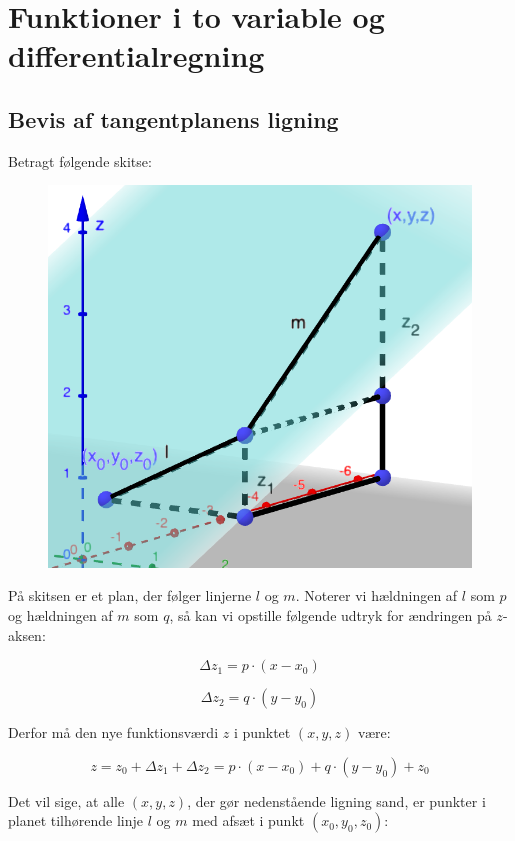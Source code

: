 \documentclass{article}
\makeatletter
\newenvironment{proofw}{\par
  \pushQED{\qed}%
  \normalfont \topsep6\p@\@plus6\p@\relax
  \trivlist
  \item[]\ignorespaces
}{%
  \popQED\endtrivlist\@endpefalse
}
\makeatother
\begin{document}
\section{Funktioner i to variable og differentialregning}

\subsection{Bevis af tangentplanens ligning}

\begin{proofw}

Betragt følgende skitse:

\begin{figure}[h]
    \centering
    \includegraphics[scale=0.5]{skitser/tangent_plan.png}
\end{figure}

På skitsen er et plan, der følger linjerne $l$ og $m$.
Noterer vi hældningen af $l$ som $p$ og hældningen af $m$ som $q$,
så kan vi opstille følgende udtryk for ændringen på $z$-aksen:

$$
    \Delta z_1=p \cdot (x-x_0)
$$

$$
    \Delta z_2=q \cdot (y-y_0)
$$

Derfor må den nye funktionsværdi $z$ i punktet $(x,y,z)$ være:

$$
    z=z_0+\Delta z_1+\Delta z_2=p \cdot (x-x_0)+q \cdot (y-y_0) + z_0
$$

Det vil sige, at alle $(x,y,z)$, der gør nedenstående ligning sand, er punkter i planet tilhørende
linje $l$ og $m$ med afsæt i punkt $(x_0,y_0,z_0)$:


\end{proofw}
\end{document}
